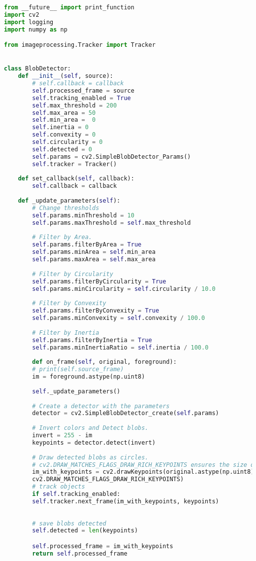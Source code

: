 \documentclass[hidelinks,11pt,a4paper,oneside,article]{memoir}
\begin{document}
\begin{lstlisting}[label={listing:blobdetection},caption={Blob detector class},language=Python, style=styleprogramming]
from __future__ import print_function
import cv2
import logging
import numpy as np

from imageprocessing.Tracker import Tracker


class BlobDetector:
    def __init__(self, source):
        # self.callback = callback
        self.processed_frame = source
        self.tracking_enabled = True
        self.max_threshold = 200
        self.max_area = 50
        self.min_area =  0
        self.inertia = 0
        self.convexity = 0
        self.circularity = 0
        self.detected = 0
        self.params = cv2.SimpleBlobDetector_Params()
        self.tracker = Tracker()
    
    def set_callback(self, callback):
        self.callback = callback
    
    def _update_parameters(self):
        # Change thresholds
        self.params.minThreshold = 10
        self.params.maxThreshold = self.max_threshold
        
        # Filter by Area.
        self.params.filterByArea = True
        self.params.minArea = self.min_area
        self.params.maxArea = self.max_area
        
        # Filter by Circularity
        self.params.filterByCircularity = True
        self.params.minCircularity = self.circularity / 10.0
        
        # Filter by Convexity
        self.params.filterByConvexity = True
        self.params.minConvexity = self.convexity / 100.0
        
        # Filter by Inertia
        self.params.filterByInertia = True
        self.params.minInertiaRatio = self.inertia / 100.0
        
        def on_frame(self, original, foreground):
        # print(self.source_frame)
        im = foreground.astype(np.uint8)
        
        self._update_parameters()
        
        # Create a detector with the parameters
        detector = cv2.SimpleBlobDetector_create(self.params)
        
        # Invert colors and Detect blobs.
        invert = 255 - im
        keypoints = detector.detect(invert)
        
        # Draw detected blobs as circles.
        # cv2.DRAW_MATCHES_FLAGS_DRAW_RICH_KEYPOINTS ensures the size of the circle corresponds to the size of blob
        im_with_keypoints = cv2.drawKeypoints(original.astype(np.uint8), keypoints, np.array([]), (0, 0, 255),
        cv2.DRAW_MATCHES_FLAGS_DRAW_RICH_KEYPOINTS)
        # track objects
        if self.tracking_enabled:
        self.tracker.next_frame(im_with_keypoints, keypoints)
        
        
        # save blobs detected
        self.detected = len(keypoints)

        self.processed_frame = im_with_keypoints
        return self.processed_frame
\end{lstlisting}
\end{document}
